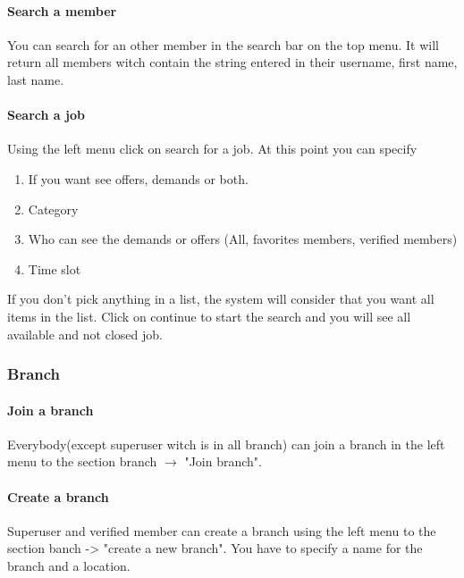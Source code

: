 \documentclass[11pt, a4paper]{article}   	%
\begin{document}
\paragraph{Search a member}
You can search for an other member in the search bar on the top menu. It will return all members witch contain the string entered in their username, first name, last name.

\paragraph{Search a job}
Using the left menu click on search for a job. At this point you can specify 
\begin{enumerate}
	\item If you want see offers, demands or both.
	\item Category
	\item Who can see the demands or offers (All, favorites members, verified members)
	\item Time slot
\end{enumerate}
If you don't pick anything in a list, the system will consider that you want all items in the list.
Click on continue to start the search and you will see all available and not closed job.

\subsubsection{Branch}

\paragraph{Join a branch}
Everybody(except superuser witch is in all branch) can join a branch in the left menu to the section branch $\to$ "Join branch".

\paragraph{Create a branch}
Superuser and verified member can create a branch using the left menu to the section banch -> "create a new branch". You have to specify a name for the branch and a location.
\end{document}
